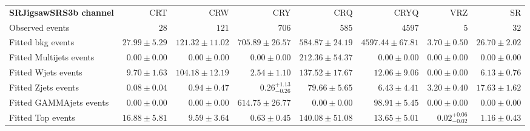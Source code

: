 

\begin{table}
\begin{center}
\setlength{\tabcolsep}{0.0pc}
{\tiny
\begin{tabular*}{\textwidth}{@{\extracolsep{\fill}}lrrrrrrr}
\noalign{\smallskip}\hline\noalign{\smallskip}
{\bf SRJigsawSRS3b channel}           & CRT            & CRW            & CRY            & CRQ            & CRYQ            & VRZ            & SR              \\[-0.05cm]
\noalign{\smallskip}\hline\noalign{\smallskip}
Observed events          & $28$              & $121$              & $706$              & $585$              & $4597$              & $5$              & $32$                    \\
\noalign{\smallskip}\hline\noalign{\smallskip}
Fitted bkg events         & $27.99 \pm 5.29$          & $121.32 \pm 11.02$          & $705.89 \pm 26.57$          & $584.87 \pm 24.19$          & $4597.44 \pm 67.81$          & $3.70 \pm 0.50$          & $26.70 \pm 2.02$              \\
\noalign{\smallskip}\hline\noalign{\smallskip}
        Fitted Multijets events         & $0.00 \pm 0.00$          & $0.00 \pm 0.00$          & $0.00 \pm 0.00$          & $212.36 \pm 54.37$          & $0.00 \pm 0.00$          & $0.00 \pm 0.00$          & $0.00 \pm 0.00$              \\
        Fitted Wjets events         & $9.70 \pm 1.63$          & $104.18 \pm 12.19$          & $2.54 \pm 1.10$          & $137.52 \pm 17.67$          & $12.06 \pm 9.06$          & $0.00 \pm 0.00$          & $6.13 \pm 0.76$              \\
        Fitted Zjets events         & $0.08 \pm 0.04$          & $0.94 \pm 0.47$          & $0.26_{-0.26}^{+1.13}$          & $79.66 \pm 5.65$          & $6.43 \pm 4.41$          & $3.20 \pm 0.40$          & $17.63 \pm 1.62$              \\
        Fitted GAMMAjets events         & $0.00 \pm 0.00$          & $0.00 \pm 0.00$          & $614.75 \pm 26.77$          & $0.00 \pm 0.00$          & $98.91 \pm 5.45$          & $0.00 \pm 0.00$          & $0.00 \pm 0.00$              \\
        Fitted Top events         & $16.88 \pm 5.81$          & $9.59 \pm 3.64$          & $0.63 \pm 0.45$          & $140.08 \pm 51.08$          & $13.65 \pm 5.01$          & $0.02_{-0.02}^{+0.06}$          & $1.16 \pm 0.43$              \\

\end{tabular*}}
\end{center}
\end{table}
